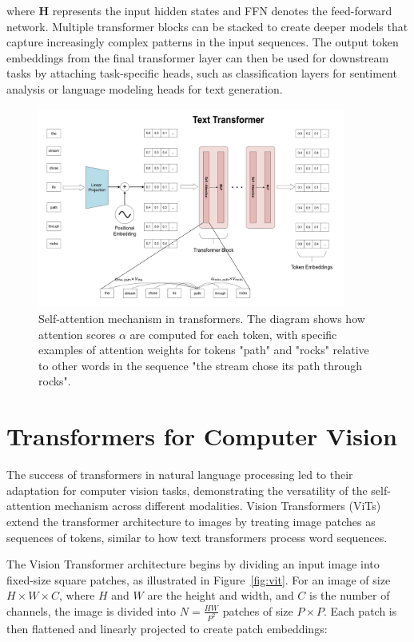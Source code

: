 where $\mathbf{H}$ represents the input hidden states and FFN denotes the feed-forward network. Multiple transformer blocks can be stacked to create deeper models that capture increasingly complex patterns in the input sequences. The output token embeddings from the final transformer layer can then be used for downstream tasks by attaching task-specific heads, such as classification layers for sentiment analysis or language modeling heads for text generation.

\begin{figure}[tb]
\centering
\includegraphics[width=0.9\textwidth]{Images/transformer.png}
\caption{Self-attention mechanism in transformers. The diagram shows how attention scores $\alpha$ are computed for each token, with specific examples of attention weights for tokens "path" and "rocks" relative to other words in the sequence "the stream chose its path through rocks".}
\label{fig:transformer}
\end{figure}

\section{Transformers for Computer Vision}

The success of transformers in natural language processing led to their adaptation for computer vision tasks, demonstrating the versatility of the self-attention mechanism across different modalities. Vision Transformers (ViTs) extend the transformer architecture to images by treating image patches as sequences of tokens, similar to how text transformers process word sequences.

The Vision Transformer architecture begins by dividing an input image into fixed-size square patches, as illustrated in Figure~\ref{fig:vit}. For an image of size $H \times W \times C$, where $H$ and $W$ are the height and width, and $C$ is the number of channels, the image is divided into $N = \frac{HW}{P^2}$ patches of size $P \times P$. Each patch is then flattened and linearly projected to create patch embeddings:

